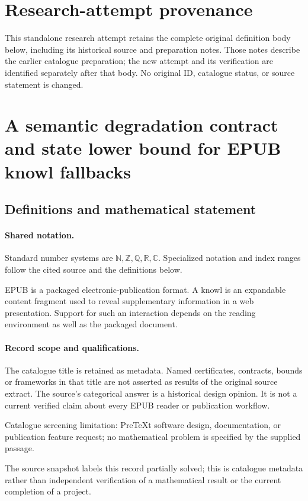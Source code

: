 \documentclass[11pt]{article}
\begin{document}
\section*{Research-attempt provenance}
This standalone research attempt retains the complete original definition body below,
including its historical source and preparation notes. Those notes describe the
earlier catalogue preparation; the new attempt and its verification are identified
separately after that body. No original ID, catalogue status, or source statement is changed.

\section{A semantic degradation contract and state lower bound for EPUB knowl fallbacks}\label{statement}

\subsection{Definitions and mathematical statement}

\paragraph{Shared notation.}Standard number systems are $\mathbb N,\mathbb Z,\mathbb Q,\mathbb R,\mathbb C$. Specialized notation and index ranges follow the cited source and the definitions below.


EPUB is a packaged electronic-publication format. A knowl is an expandable content fragment used to reveal supplementary information in a web presentation. Support for such an interaction depends on the reading environment as well as the packaged document.
\paragraph{Record scope and qualifications.}
The catalogue title is retained as metadata. Named certificates, contracts, bounds or frameworks in that title are not asserted as results of the original source extract.
The source's categorical answer is a historical design opinion. It is not a current verified claim about every EPUB reader or publication workflow.

Catalogue screening limitation: PreTeXt software design, documentation, or publication feature request; no mathematical problem is specified by the supplied passage.

The source snapshot labels this record partially solved; this is catalogue metadata rather than independent verification of a mathematical result or the current completion of a project.
\end{document}

